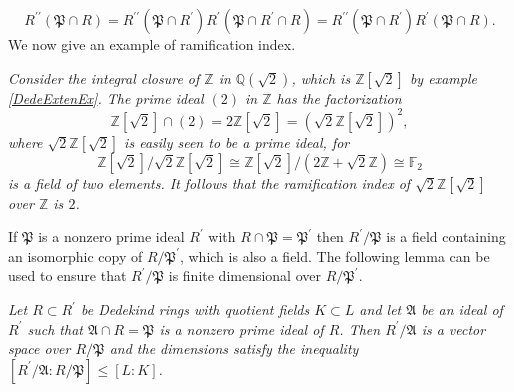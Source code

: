 $$
R^{\prime\prime}\left( \mathfrak{P} \cap R \right) =R^{\prime\prime}\left( \mathfrak{P} \cap R^{\prime} \right) R^{\prime}\left( \mathfrak{P} \cap R^{\prime}\cap R \right) =R^{\prime\prime}\left( \mathfrak{P} \cap R^{\prime} \right) R^{\prime}\left( \mathfrak{P} \cap R \right) .
$$
We now give an example of ramification index.
\begin{example}\em
Consider the integral closure of $\mathbb{Z}$ in $\mathbb{Q}(\sqrt{2})$, which is $\mathbb{Z}[\sqrt{2}]$ by example \ref{DedeExtenEx}. The prime ideal $(2)$ in $\mathbb{Z}$ has the factorization 
$$
\mathbb{Z} \left[ \sqrt{2} \right] \cap \left( 2 \right) =2\mathbb{Z} \left[ \sqrt{2} \right] =\left( \sqrt{2}\mathbb{Z} \left[ \sqrt{2} \right] \right) ^2,
$$
where $\sqrt{2}\mathbb{Z}[\sqrt{2}]$ is easily seen to be a prime ideal, for 
$$
\mathbb{Z} \left[ \sqrt{2} \right] /\sqrt{2}\mathbb{Z} \left[ \sqrt{2} \right] \cong \mathbb{Z} \left[ \sqrt{2} \right] /\left( 2\mathbb{Z} +\sqrt{2}\mathbb{Z} \right) \cong \mathbb{F} _2
$$
is a field of two elements. It follows that the ramification index of $\sqrt{2}\mathbb{Z}[\sqrt{2}]$ over $\mathbb{Z}$ is $2$.
\end{example}
If $\mathfrak{P}$ is a nonzero prime ideal $R^\prime$ with $R\cap\mathfrak{P}=\mathfrak{P}^\prime$ then $R^\prime/\mathfrak{P}$ is a field containing an isomorphic copy of $R/\mathfrak{P}^\prime$, which is also a field. The following lemma can be used to ensure that $R^\prime/\mathfrak{P}$ is finite dimensional over $R/\mathfrak{P}^\prime$.
\begin{lemma}\em\label{LemDim}
Let $R\subset R^\prime$ be Dedekind rings with quotient fields $K\subset L$ and let $\mathfrak{A}$ be an ideal of $R^\prime$ such that $\mathfrak{A}\cap R=\mathfrak{P}$ is a nonzero prime ideal of $R$. Then $R^\prime/\mathfrak{A}$ is a vector space over $R/\mathfrak{P}$ and the dimensions satisfy the inequality $\left[ R^{\prime}/\mathfrak{A} :R/\mathfrak{P} \right] \le \left[ L:K \right] $.
\end{lemma}
